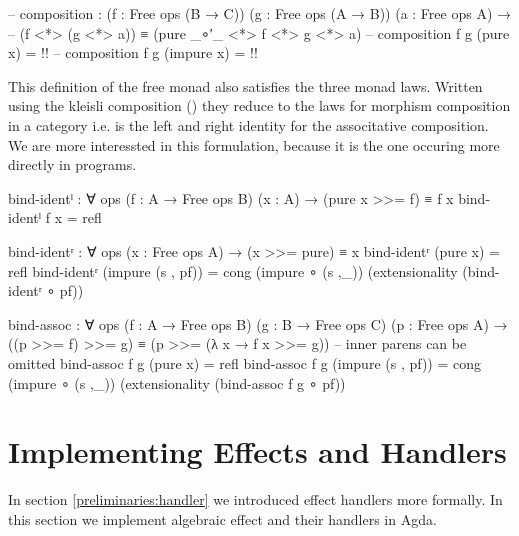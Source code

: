 \begin{code}[hide]
-- composition : (f : Free ops (B → C)) (g : Free ops (A → B)) (a : Free ops A) →
--    (f <*> (g <*> a)) ≡ (pure _∘′_ <*> f <*> g <*> a)
-- composition f g (pure x) = {!!}
-- composition f g (impure x) = {!!}
\end{code}
This definition of the free monad also satisfies the three monad laws.
Written using the kleisli composition (\AgdaFunction{>=>}) they reduce to the
laws for morphism composition in a category i.e.
 is the left and right identity for the
associtative composition.
We are more interessted in this formulation, because it is the one occuring more
directly in programs.

\begin{code}[number=bind-ident-left]
bind-identˡ : ∀ {ops} (f : A → Free ops B) (x : A) → (pure x >>= f) ≡ f x
bind-identˡ f x = refl
\end{code}
\begin{code}[number=bind-ident-right]
bind-identʳ : ∀ {ops} (x : Free ops A) → (x >>= pure) ≡ x
bind-identʳ (pure x)           = refl
bind-identʳ (impure (s , pf))  = cong (impure ∘ (s ,_)) (extensionality (bind-identʳ ∘ pf))
\end{code}
\begin{code}[number=bind-assoc]
bind-assoc : ∀ {ops} (f : A → Free ops B) (g : B → Free ops C) (p : Free ops A) →
  ((p >>= f) >>= g) ≡ (p >>= (λ x → f x >>= g)) -- inner parens can be omitted
bind-assoc f g (pure x)           = refl
bind-assoc f g (impure (s , pf))  = cong (impure ∘ (s ,_)) (extensionality (bind-assoc f g ∘ pf))
\end{code}


\section{Implementing Effects and Handlers}

In section \ref{preliminaries:handler} we introduced effect handlers more
formally.
In this section we implement algebraic effect and their handlers in Agda.

